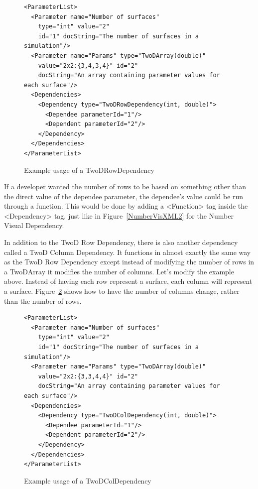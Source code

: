 \begin{figure}
\centering
{\footnotesize
\begin{Verbatim}
<ParameterList>
  <Parameter name="Number of surfaces" 
    type="int" value="2"
    id="1" docString="The number of surfaces in a simulation"/>
  <Parameter name="Params" type="TwoDArray(double)"
    value="2x2:{3,4,3,4}" id="2" 
    docString="An array containing parameter values for each surface"/>
  <Dependencies>
    <Dependency type="TwoDRowDependency(int, double)">
      <Dependee parameterId="1"/>
      <Dependent parameterId="2"/>
    </Dependency>
  </Dependencies>
</ParameterList>
\end{Verbatim}
}
\caption{Example usage of a TwoDRowDependency}
\label{TwoDRowXML}
\end{figure}

If a developer wanted the number of rows to be based on something other than the direct value of the dependee parameter, the dependee's value could be
run through a function. 
This would be done by adding a <Function> tag inside the <Dependency> tag, just like in Figure~\ref{NumberVisXML2} for the Number Visual Dependency.

In addition to the TwoD Row Dependency, there is also another dependency called a TwoD Column Dependency. It functions in almost exactly the same way
as the TwoD Row Dependency except instead of modifying the number of rows in a TwoDArray it modifies the number of columns. Let's modify the example above.
Instead of having each row represent a surface, each column will represent a surface. Figure~\ref{TwoDColXML} shows how to have the number of columns
change, rather than the number of rows.
\begin{figure}
\centering
{\footnotesize
\begin{Verbatim}
<ParameterList>
  <Parameter name="Number of surfaces" 
    type="int" value="2"
    id="1" docString="The number of surfaces in a simulation"/>
  <Parameter name="Params" type="TwoDArray(double)"
    value="2x2:{3,3,4,4}" id="2" 
    docString="An array containing parameter values for each surface"/>
  <Dependencies>
    <Dependency type="TwoDColDependency(int, double)">
      <Dependee parameterId="1"/>
      <Dependent parameterId="2"/>
    </Dependency>
  </Dependencies>
</ParameterList>
\end{Verbatim}
}
\caption{Example usage of a TwoDColDependency}
\label{TwoDColXML}
\end{figure}

